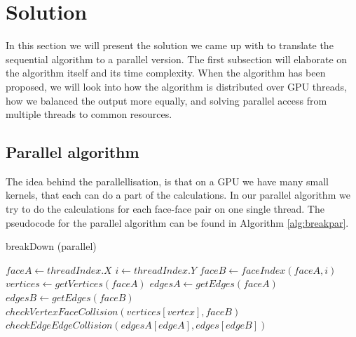 \section{Solution}
In this section we will present the solution we came up with to translate the sequential algorithm to a parallel version. The first subsection will elaborate on the algorithm itself and its time complexity. When the algorithm has been proposed, we will look into how the algorithm is distributed over GPU threads, how we balanced the output more equally, and solving parallel access from multiple threads to common resources.

\subsection{Parallel algorithm}
The idea behind the parallellisation, is that on a GPU we have many small kernels, that each can do a part of the calculations. In our parallel algorithm we try to do the calculations for each face-face pair on one single thread. The pseudocode for the parallel algorithm can be found in Algorithm \ref{alg:breakpar}.

\begin{algorithm}
\caption{breakDown (parallel)}\label{alg:breakpar}
\begin{algorithmic}[1]
    \State $faceA \gets threadIndex.X$
    \State $i \gets threadIndex.Y$
    \State $faceB \gets faceIndex(faceA, i)$ 
    \State $vertices \gets getVertices(faceA)$
    \State $edgesA \gets getEdges(faceA)$
    \State $edgesB \gets getEdges(faceB)$
            \State $checkVertexFaceCollision(vertices[vertex], faceB)$
        \EndFor
                    \State $checkEdgeEdgeCollision(edgesA[edgeA], edges[edgeB])$
                \EndIf
            \EndFor
        \EndFor
\EndProcedure
\end{algorithmic}
\end{algorithm}


